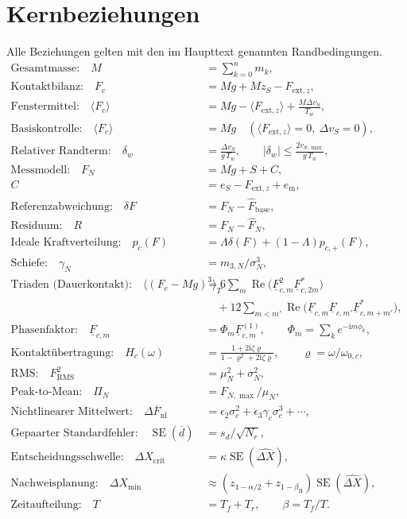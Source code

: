 \documentclass[11pt,a4paper]{article}
\newcommand{\SE}{\operatorname{SE}}
\begin{document}
\section{Kernbeziehungen}
Alle Beziehungen gelten mit den im Haupttext genannten Randbedingungen.
\begin{align*}
\text{Gesamtmasse:}\quad M&=\sum_{k=0}^{n}m_k,\\
\text{Kontaktbilanz:}\quad F_c&=Mg+M\ddot z_S-F_{\mathrm{ext},z},\\
\text{Fenstermittel:}\quad\langle F_c\rangle&=Mg-\langle F_{\mathrm{ext},z}\rangle+\frac{M\Delta v_S}{T_w},\\
\text{Basiskontrolle:}\quad\langle F_c\rangle&=Mg\quad(\langle F_{\mathrm{ext},z}\rangle=0,\ \Delta v_S=0),\\
\text{Relativer Randterm:}\quad\delta_w&=\frac{\Delta v_S}{g\,T_w},\qquad|\delta_w|\le\frac{2v_{S,\max}}{g\,T_w},\\
\text{Messmodell:}\quad F_N&=Mg+S+C,\\
C&=e_S-F_{\mathrm{ext},z}+e_{\mathrm m},\\
\text{Referenzabweichung:}\quad\delta F&=F_N-\hat F_{\mathrm{base}},\\
\text{Residuum:}\quad R&=F_N-\hat F_N,\\
\text{Ideale Kraftverteilung:}\quad p_c(F)&=\Lambda\delta(F)+(1-\Lambda)p_{c,+}(F),\\
\text{Schiefe:}\quad\gamma_N&=m_{3,N}/\sigma_N^3,\\
\text{Triaden (Dauerkontakt):}\quad\bigl\langle(F_c-Mg)^3\bigr\rangle_T&=6\sum_{m}\operatorname{Re}\bigl(\underline{F}_{c,m}^2\underline{F}_{c,2m}^*\bigr)\\
&\quad+12\sum_{m<m'}\operatorname{Re}\bigl(\underline{F}_{c,m}\underline{F}_{c,m'}\underline{F}_{c,m+m'}^*\bigr),\\
\text{Phasenfaktor:}\quad\underline{F}_{c,m}&=\Phi_m\underline{F}^{(1)}_{c,m},\qquad\Phi_m=\sum_k e^{-\mathrm i m\phi_k},\\
\text{Kontaktübertragung:}\quad H_c(\omega)&=\frac{1+2\mathrm i\zeta\varrho}{1-\varrho^2+2\mathrm i\zeta\varrho},\qquad\varrho=\omega/\omega_{0,c},\\
\text{RMS:}\quad F_{\mathrm{RMS}}^2&=\mu_N^2+\sigma_N^2,\\
\text{Peak-to-Mean:}\quad\Pi_N&=F_{N,\max}/\mu_N,\\
\text{Nichtlinearer Mittelwert:}\quad\Delta\overline F_{\mathrm{nl}}&=\epsilon_2\sigma_c^2+\epsilon_3\gamma_c\sigma_c^3+\cdots,\\
\text{Gepaarter Standardfehler:}\quad\SE(\overline d)&=s_d/\sqrt{N_r},\\
\text{Entscheidungsschwelle:}\quad\Delta X_{\mathrm{crit}}&=\kappa\SE(\widehat{\Delta X}),\\
\text{Nachweisplanung:}\quad\Delta X_{\min}&\approx(z_{1-\alpha/2}+z_{1-\beta_{\mathrm{II}}})\SE(\widehat{\Delta X}),\\
\text{Zeitaufteilung:}\quad T&=T_f+T_r,\qquad\beta=T_f/T.
\end{align*}
\end{document}
